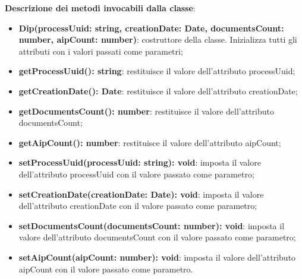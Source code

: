 \documentclass[a4paper,12pt]{article}
\begin{document}
{{{              \noindent \textbf{Descrizione dei metodi invocabili dalla classe}:
                \begin{itemize}
                    \item \textbf{Dip(processUuid: string, creationDate: Date, documentsCount: number, aipCount: number)}: costruttore della classe. Inizializza tutti gli attributi con i valori passati come parametri;
                    \item \textbf{getProcessUuid(): string}: restituisce il valore dell'attributo processUuid;
                    \item \textbf{getCreationDate(): Date}: restituisce il valore dell'attributo creationDate;
                    \item \textbf{getDocumentsCount(): number}: restituisce il valore dell'attributo documentsCount;
                    \item \textbf{getAipCount(): number}: restituisce il valore dell'attributo aipCount;
                    \item \textbf{setProcessUuid(processUuid: string): void}: imposta il valore dell'attributo processUuid con il valore passato come parametro;
                    \item \textbf{setCreationDate(creationDate: Date): void}: imposta il valore dell'attributo creationDate con il valore passato come parametro;
                    \item \textbf{setDocumentsCount(documentsCount: number): void}: imposta il valore dell'attributo documentsCount con il valore passato come parametro;
                    \item \textbf{setAipCount(aipCount: number): void}: imposta il valore dell'attributo aipCount con il valore passato come parametro.
                \end{itemize}
}}}
\end{document}
